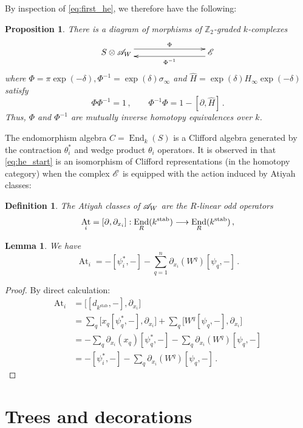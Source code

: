 \documentclass[english,letter paper,12pt,leqno]{article}
\newtheorem{proposition}[theorem]{Proposition}
\newtheorem{lemma}[theorem]{Lemma}
\theoremstyle{example}
\newtheorem{definition}[theorem]{Definition}
\numberwithin{equation}{section}
\def\stab{\operatorname{stab}}
\def\be{\begin{equation}}
\def\ee{\end{equation}}
\def\nZ{\mathds{Z}}
\DeclareMathOperator{\End}{End}
\DeclareMathOperator{\At}{At}
\begin{document}
By inspection of \eqref{eq:first_he}, we therefore have the following:

\begin{proposition}\label{prop:he_start} There is a diagram of morphisms of $\nZ_2$-graded $k$-complexes
\be\label{eq:he_start}
\xymatrix@C+5pc{
S \otimes \md{A}_W \ar@<1ex>[r]^-{\Phi} & \md{E}\ar@<1ex>[l]^-{\Phi^{-1}}
}
\ee
where $\Phi = \pi \exp(-\delta), \Phi^{-1} = \exp(\delta) \sigma_\infty$ and $\widehat{H} = \exp(\delta) H_\infty \exp(-\delta)$ satisfy
\be
\Phi \Phi^{-1} = 1\,, \qquad \Phi^{-1} \Phi = 1 - [\partial, \widehat{H}]\,.
\ee
Thus, $\Phi$ and $\Phi^{-1}$ are mutually inverse homotopy equivalences over $k$.
\end{proposition}

The endomorphism algebra $C = \End_k(S)$ is a Clifford algebra generated by the contraction $\theta_i^*$ and wedge product $\theta_i$ operators. It is observed in \cite{murfet} that \eqref{eq:he_start} is an isomorphism of Clifford representations (in the homotopy category) when the complex $\mathscr{E}$ is equipped with the action induced by Atiyah classes:

\begin{definition}
The Atiyah classes of $\mathscr{A}_W$ are the $R$-linear odd operators
\[
\At_i = [\partial, \partial_{x_i}]: \End_R(k^{\stab}) \lto \End_R(k^{\stab})\,,
\]
\end{definition}

\begin{lemma} We have
\[
\At_i = -[\psi_i^*, -] - \sum_{q=1}^n \partial_{x_i}(W^q) [ \psi_q, - ]\,.
\]
\end{lemma}
\begin{proof}
By direct calculation:
\begin{align*}
\At_i &= \big[ [d_{k^{\stab}},-], \partial_{x_i} \big]\\
&= \sum_q \big[x_q [\psi_q^*,-], \partial_{x_i}\big] + \sum_q \big[W^q [\psi_q,-], \partial_{x_i}\big]\\
&= -\sum_q \partial_{x_i}(x_q) [\psi_q^*,-] - \sum_q \partial_{x_i}(W^q) [\psi_q,-]\\
&= -[\psi_i^*,-] - \sum_q \partial_{x_i}(W^q) [\psi_q, -]\,.
\end{align*}
\end{proof}

\section{Trees and decorations}
\end{document}
